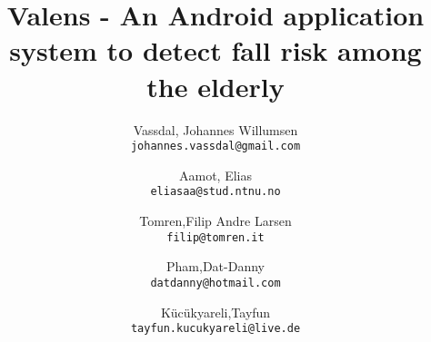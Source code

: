 \documentclass[12pt,a4paper,table]{report}
\title{Valens - An Android application system to detect fall risk among the elderly}
\author{
  Vassdal, Johannes Willumsen\\
  \texttt{johannes.vassdal@gmail.com}
  \and
  Aamot, Elias\\
  \texttt{eliasaa@stud.ntnu.no}
  \and
  Tomren,Filip Andre Larsen\\
  \texttt{filip@tomren.it}
    \and
  Pham,Dat-Danny\\
  \texttt{datdanny@hotmail.com}
    \and
  K\"{u}c\"{u}kyareli,Tayfun\\
  \texttt{tayfun.kucukyareli@live.de}
}
\begin{document}
\onehalfspacing
\maketitle
\tableofcontents












\end{document}
